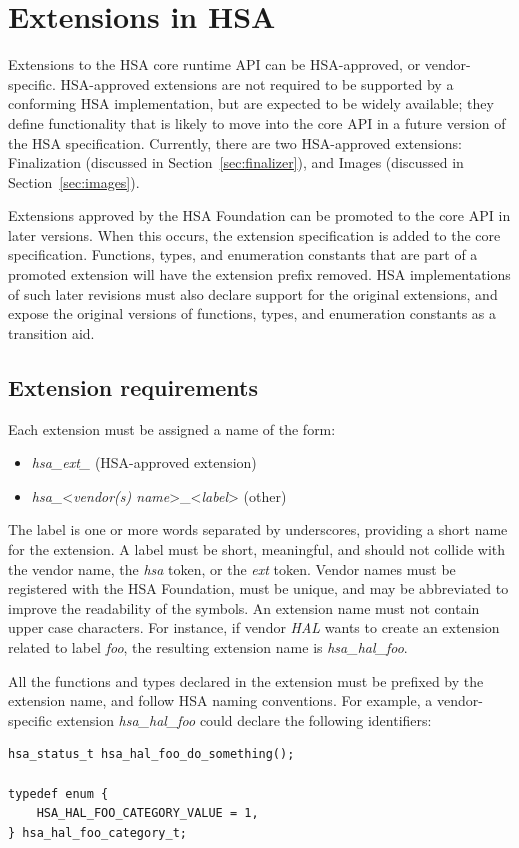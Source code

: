 \documentclass[oneside]{book}
\begin{document}
\section{Extensions in HSA}
Extensions to the HSA core runtime API can be HSA-approved, or vendor-specific.
HSA-approved extensions are not required to be supported by a conforming HSA
implementation, but are expected to be widely available; they define
functionality that is likely to move into the core API in a future version of
the HSA specification. Currently, there are two HSA-approved extensions:
Finalization (discussed in Section~\ref{sec:finalizer}), and Images
(discussed in Section~\ref{sec:images}).

Extensions approved by the HSA Foundation can be promoted to the core API in
later versions. When this occurs, the extension specification is added to the
core specification. Functions, types, and enumeration constants that are part of
a promoted extension will have the extension prefix removed. HSA implementations
of such later revisions must also declare support for the original extensions,
and expose the original versions of functions, types, and enumeration constants
as a transition aid.

\subsection{Extension requirements}

Each extension must be assigned a name of the form:
\begin{itemize}[itemsep=1pt,topsep=3pt,partopsep=0pt]
\item \textit{hsa_ext_} (HSA-approved extension)
\item \textit{hsa_}<\textit{vendor(s) name}>_<\textit{label}> (other)
\end{itemize}
The label is one or more words separated by underscores, providing a short name
for the extension. A label must be short, meaningful, and should not collide
with the vendor name, the \textit{hsa} token, or the \textit{ext} token. Vendor
names must be registered with the HSA Foundation, must be unique, and may be
abbreviated to improve the readability of the symbols. An extension name must
not contain upper case characters. For instance, if vendor \textit{HAL} wants to
create an extension related to label \textit{foo}, the resulting extension name
is \textit{hsa_hal_foo}.

All the functions and types declared in the extension must be prefixed by the
extension name, and follow HSA naming conventions. For example, a
vendor-specific extension \textit{hsa_hal_foo} could declare the following
identifiers:
\begin{lstlisting}
hsa_status_t hsa_hal_foo_do_something();

typedef enum {
    HSA_HAL_FOO_CATEGORY_VALUE = 1,
} hsa_hal_foo_category_t;
\end{lstlisting}
\end{document}

